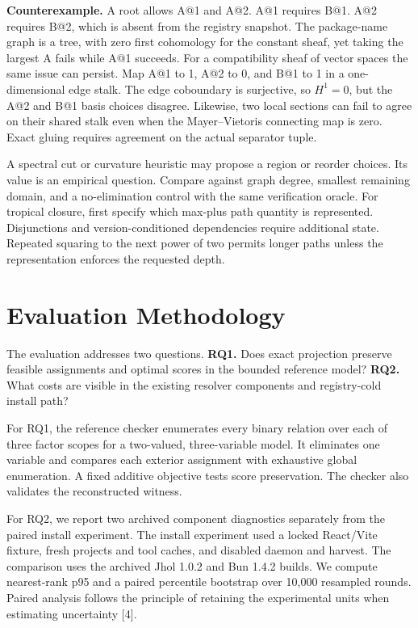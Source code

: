 \documentclass[
  11pt,
  letterpaper,
]{article}
\begin{document}
\textbf{Counterexample.} A root allows A@1 and A@2. A@1 requires B@1.
A@2 requires B@2, which is absent from the registry snapshot. The
package-name graph is a tree, with zero first cohomology for the
constant sheaf, yet taking the largest A fails while A@1 succeeds. For a
compatibility sheaf of vector spaces the same issue can persist. Map A@1
to 1, A@2 to 0, and B@1 to 1 in a one-dimensional edge stalk. The edge
coboundary is surjective, so \(H^1=0\), but the A@2 and B@1 basis
choices disagree. Likewise, two local sections can fail to agree on
their shared stalk even when the Mayer--Vietoris connecting map is zero.
Exact gluing requires agreement on the actual separator tuple.

A spectral cut or curvature heuristic may propose a region or reorder
choices. Its value is an empirical question. Compare against graph
degree, smallest remaining domain, and a no-elimination control with the
same verification oracle. For tropical closure, first specify which
max-plus path quantity is represented. Disjunctions and
version-conditioned dependencies require additional state. Repeated
squaring to the next power of two permits longer paths unless the
representation enforces the requested depth.

\section{Evaluation Methodology}\label{evaluation-methodology}

The evaluation addresses two questions. \textbf{RQ1.} Does exact
projection preserve feasible assignments and optimal scores in the
bounded reference model? \textbf{RQ2.} What costs are visible in the
existing resolver components and registry-cold install path?

For RQ1, the reference checker enumerates every binary relation over
each of three factor scopes for a two-valued, three-variable model. It
eliminates one variable and compares each exterior assignment with
exhaustive global enumeration. A fixed additive objective tests score
preservation. The checker also validates the reconstructed witness.

For RQ2, we report two archived component diagnostics separately from
the paired install experiment. The install experiment used a locked
React/Vite fixture, fresh projects and tool caches, and disabled daemon
and harvest. The comparison uses the archived Jhol 1.0.2 and Bun 1.4.2
builds. We compute nearest-rank p95 and a paired percentile bootstrap
over 10,000 resampled rounds. Paired analysis follows the principle of
retaining the experimental units when estimating uncertainty {[}4{]}.
\end{document}

